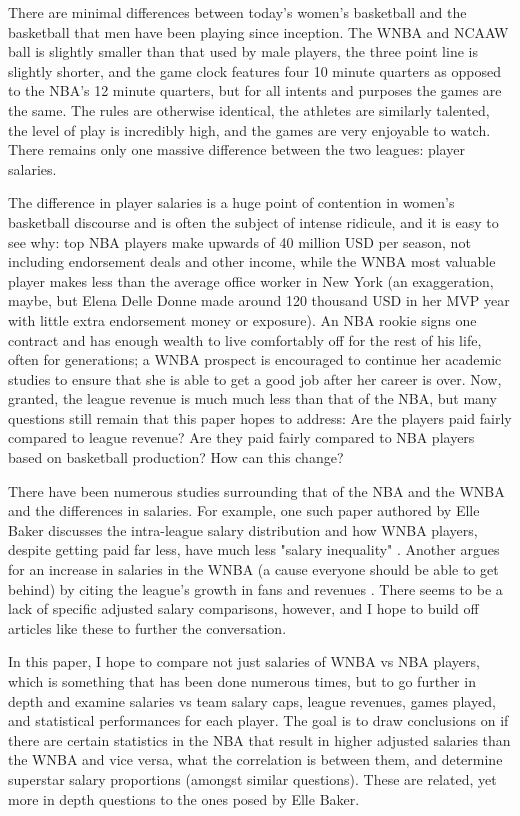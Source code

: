 \documentclass[12pt]{article}
\begin{document}
\par
There are minimal differences between today's women’s basketball and the basketball that men have been playing since inception. The WNBA and NCAAW ball is slightly smaller than that used by male players, the three point line is slightly shorter, and the game clock features four 10 minute quarters as opposed to the NBA’s 12 minute quarters, but for all intents and purposes the games are the same. The rules are otherwise identical, the athletes are similarly talented, the level of play is incredibly high, and the games are very enjoyable to watch. There remains only one massive difference between the two leagues: player salaries.
\par
The difference in player salaries is a huge point of contention in women’s basketball discourse and is often the subject of intense ridicule, and it is easy to see why: top NBA players make upwards of 40 million USD per season, not including endorsement deals and other income, while the WNBA most valuable player makes less than the average office worker in New York (an exaggeration, maybe, but Elena Delle Donne made around 120 thousand USD in her MVP year with little extra endorsement money or exposure). An NBA rookie signs one contract and has enough wealth to live comfortably off for the rest of his life, often for generations; a WNBA prospect is encouraged to continue her academic studies to ensure that she is able to get a good job after her career is over. Now, granted, the league revenue is much much less than that of the NBA, but many questions still remain that this paper hopes to address: Are the players paid fairly compared to league revenue? Are they paid fairly compared to NBA players based on basketball production? How can this change?
\par
There have been numerous studies surrounding that of the NBA and the WNBA and the differences in salaries.
For example, one such paper authored by Elle Baker discusses the intra-league salary distribution and
how WNBA players, despite getting paid far less, have much less "salary inequality"
\cite{baker2020comparison}. Another argues for an increase in salaries in the WNBA (a cause everyone
should be able to get behind) by citing the league's growth in fans and revenues \cite{ettienne2019s}.
There seems to be a lack of specific adjusted salary comparisons, however, and I hope to build off articles
like these to further the conversation.
\par
In this paper, I hope to compare not just salaries of WNBA vs NBA players, which is something that has been done numerous times, but to go further in depth and examine salaries vs team salary caps, league revenues, games played, and statistical performances for each player. The goal is to draw conclusions on if there are certain statistics in the NBA that result in higher adjusted salaries than the WNBA and vice versa, what the correlation is between them, and determine superstar salary proportions (amongst similar questions). These are related, yet more in depth questions to the ones posed by Elle Baker.
\end{document}
